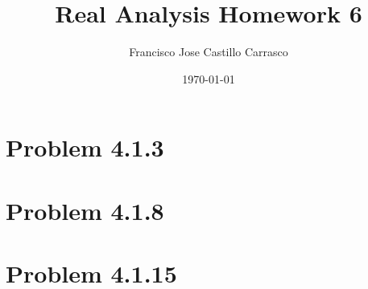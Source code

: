 




\title{Real Analysis Homework 6}
\author{Francisco Jose Castillo Carrasco}
\date{\today}
\maketitle




\section{Problem 4.1.3}


\section{Problem 4.1.8}


\section{Problem 4.1.15}







